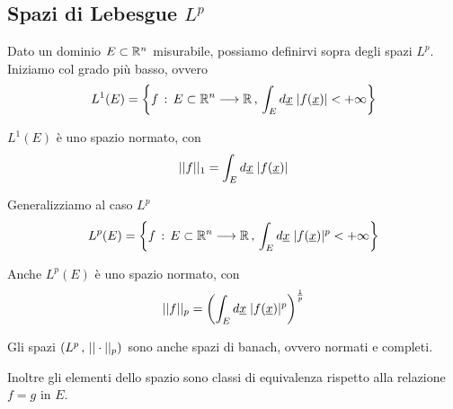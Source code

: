 \begin{figure}[!htb]
\end{figure}

\newpage


\subsection{Spazi di Lebesgue $L^p$}

Dato un dominio $E\subset \mathbb{R}^n$ misurabile, possiamo definirvi sopra degli spazi $L^p$. Iniziamo col grado più basso, ovvero
\begin{align}
	L^1(E) = \left\{ f \, : \, E \subset \mathbb{R}^n \longrightarrow \mathbb{R} \, , \, \int_{E} d\underline{x} \; |f(\underline{x})|< + \infty  \right\}
\end{align}

$L^1(E)$ è uno spazio normato, con
\begin{align}
	||f||_1 = \int_{E} d\underline{x} \; |f(\underline{x})|
\end{align}

Generalizziamo al caso $L^p$
\begin{align}
	L^p(E) = \left\{ f \, : \, E \subset \mathbb{R}^n \longrightarrow \mathbb{R} \, , \, \int_{E} d\underline{x} \; |f(\underline{x})|^p< + \infty  \right\}
\end{align}

Anche $L^p(E)$ è uno spazio normato, con
\begin{align}
	||f||_p = \left(\int_{E} d\underline{x} \; |f(\underline{x})|^p \right)^{\frac{1}{p}}
\end{align}

Gli spazi $(L^p \, , \, ||\cdot||_p)$ sono anche spazi di banach, ovvero normati e completi. 

Inoltre gli elementi dello spazio sono classi di equivalenza rispetto alla relazione $f=g$ \qo in $E$.

\bigskip

